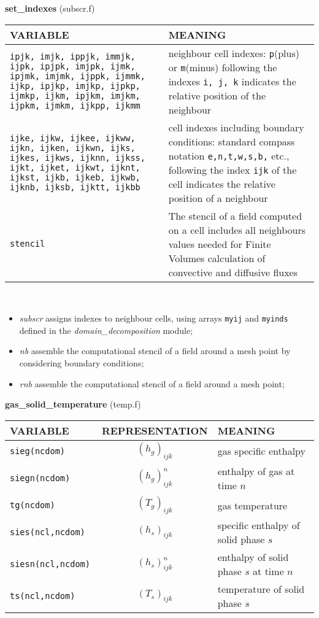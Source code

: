 %
%
{\large{\bf set\_indexes}} (subscr.f)\\[5mm]
\begin{tabular}{|p{6cm}|p{6cm}|}\hline
VARIABLE & MEANING \\ \hline
\tt ipjk, imjk, ippjk, immjk, ijpk, ipjpk, imjpk, ijmk, ipjmk, imjmk, ijppk, ijmmk, ijkp, ipjkp, imjkp, ijpkp, ijmkp, ijkm, ipjkm, imjkm, ijpkm, ijmkm, ijkpp, ijkmm & neighbour cell indexes: {\tt p}(plus) or {\tt m}(minus) following the indexes {\tt i, j, k} indicates the relative position of the neighbour\\\hline
\tt ijke, ijkw, ijkee, ijkww, ijkn, ijken, ijkwn, ijks, ijkes, ijkws, ijknn, ijkss, ijkt, ijket, ijkwt, ijknt, ijkst, ijkb, ijkeb, ijkwb, ijknb, ijksb, ijktt, ijkbb & cell indexes including boundary conditions: standard compass notation {\tt e,n,t,w,s,b,} etc., following the index {\tt ijk} of the cell indicates the relative position of a neighbour \\\hline
\tt stencil & The stencil of a field computed on a cell includes all neighbours values needed for Finite Volumes calculation of convective and diffusive fluxes \\\hline
\end{tabular}\\
\begin{itemize}
\item{\em subscr} assigns indexes to neighbour cells, using arrays {\tt myij} and {\tt myinds} defined in the {\em domain\_decomposition} module;
\item{\em nb} assemble the computational stencil of a field around a mesh point by considering boundary conditions;
\item{\em rnb} assemble the computational stencil of a field around a mesh point;
\end{itemize}
%
%
{\large {\bf gas\_solid\_temperature}} (temp.f)\\[5mm]
\begin{tabular}{|p{6cm}|c|p{6cm}|}\hline
VARIABLE & REPRESENTATION & MEANING\\\hline
\tt sieg(ncdom) & $(h_g)_{ijk}$ &  gas specific enthalpy \\\hline 
\tt siegn(ncdom) & $(h_g)^{n}_{ijk}$ &  enthalpy of gas at time $n$\\\hline
\tt tg(ncdom) & $(T_g)_{ijk}$ &  gas temperature\\\hline
\tt sies(ncl,ncdom) & $(h_s)_{ijk}$ &  specific enthalpy of solid phase $s$ \\\hline
\tt siesn(ncl,ncdom) & $(h_s)^{n}_{ijk}$ &  enthalpy of solid phase $s$ at time $n$\\\hline
\tt ts(ncl,ncdom) & $(T_s)_{ijk}$ &  temperature of solid phase $s$\\\hline
\end{tabular}\\[5mm]

